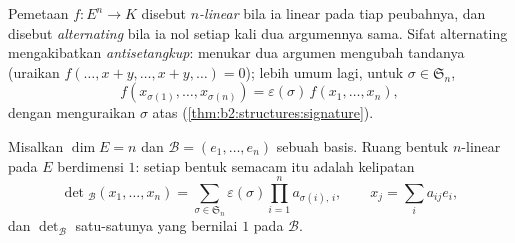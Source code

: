 \begin{definition}\label{def:b2:linalg:alternating}
Pemetaan $f \colon E^n \to K$ disebut \emph{$n$-linear} bila ia linear
pada tiap peubahnya, dan disebut
\emph{alternating} bila
ia nol setiap kali dua argumennya sama. Sifat alternating mengakibatkan
\emph{antisetangkup}: menukar dua argumen mengubah tandanya
(uraikan $f(\dots, x + y, \dots, x + y, \dots) = 0$); lebih umum lagi,
untuk $\sigma \in \mathfrak{S}_n$,
\[
f(x_{\sigma(1)}, \dots, x_{\sigma(n)}) =
\varepsilon(\sigma)\, f(x_1, \dots, x_n),
\]
dengan menguraikan $\sigma$ atas 
(\cref{thm:b2:structures:signature}).
\end{definition}

\begin{theorem}\label{thm:b2:linalg:detspace}
Misalkan $\dim E = n$ dan $\mathcal{B} = (e_1, \dots, e_n)$ sebuah basis.
Ruang bentuk $n$-linear  pada $E$ berdimensi $1$:
setiap bentuk semacam itu adalah kelipatan
\[
\det{}_{\mathcal{B}}(x_1, \dots, x_n)
= \sum_{\sigma \in \mathfrak{S}_n} \varepsilon(\sigma)
\prod_{i=1}^{n} a_{\sigma(i),\,i},
\qquad
x_j = \sum_{i} a_{ij} e_i ,
\]
dan $\det_{\mathcal{B}}$ satu-satunya yang bernilai $1$ pada
$\mathcal{B}$.
\end{theorem}

